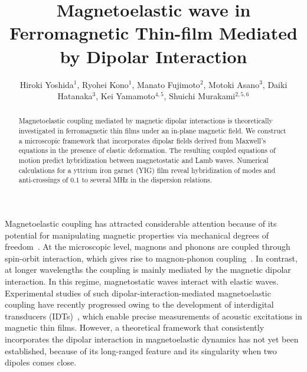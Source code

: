 \documentclass[10pt]{iopart}
\begin{document}
\title{Magnetoelastic wave in Ferromagnetic Thin-film Mediated by Dipolar Interaction}

\author{Hiroki Yoshida$^1$, Ryohei Kono$^1$, Manato Fujimoto$^2$, Motoki Asano$^3$, Daiki Hatanaka$^3$, Kei Yamamoto$^{4,5}$, Shuichi Murakami$^{2,5,6}$}
\address{$^1$ Department of Physics, Institute of Science Tokyo, 2-12-1 Ookayama, Meguro-ku, Tokyo 152-8551, Japan}
\address{$^2$ Department of Applied Physics, The University of Tokyo, 7-3-1 Hongo, Bunkyo-ku, Tokyo 113-8656, Japan}
\address{$^3$ Basic Research Laboratories, NTT, Inc., 3-1 Morinosato-Wakamiya, Atsugi-shi, Kanagawa 243-0198, Japan}
\address{$^4$ Advanced Science Research Center, Japan Atomic Energy Agency, Tokai, Ibaraki 319-1195, Japan}
\address{$^5$ Center for Emergent Matter Science, RIKEN, 2-1 Hirosawa, Wako, Saitama 351-0198, Japan}
\address{$^6$ International Institute for Sustainability with Knotted Chiral Meta Matter (WPI-SKCM$^2$), Hiroshima University, Higashi-hiroshima, Hiroshima 739-0046, Japan}


\begin{abstract}
    Magnetoelastic coupling mediated by magnetic dipolar interactions is theoretically investigated in ferromagnetic thin films under an in-plane magnetic field. We construct a microscopic framework that incorporates dipolar fields derived from Maxwell's equations in the presence of elastic deformation. The resulting coupled equations of motion predict hybridization between magnetostatic and Lamb waves. Numerical calculations for a yttrium iron garnet (YIG) film reveal hybridization of modes and anti-crossings of $0.1$ to several MHz in the dispersion relations.
\end{abstract}

\submitto{\APEX}
\maketitle
\ioptwocol

Magnetoelastic coupling has attracted considerable attention because of its potential for manipulating magnetic properties via mechanical degrees of freedom~\cite{Kittel_PR,LL_EDinCM}. At the microscopic level, magnons and phonons are coupled through spin-orbit interaction, which gives rise to magnon-phonon coupling~\cite{Kittel_PR,Kittel_Abraham_RMP,Flebus_magnonPolaron}. In contrast, at longer wavelengths the coupling is mainly mediated by the magnetic dipolar interaction. In this regime, magnetostatic waves interact with elastic waves. Experimental studies of such dipolar-interaction-mediated magnetoelastic coupling have recently progressed owing to the development of interdigital transducers (IDTs)~\cite{IDT_review,Kunstle2025}, which enable precise measurements of acoustic excitations in magnetic thin films. However, a theoretical framework that consistently incorporates the dipolar interaction in magnetoelastic dynamics has not yet been established, because of its long-ranged feature and its singularity when two dipoles comes close.
\end{document}
